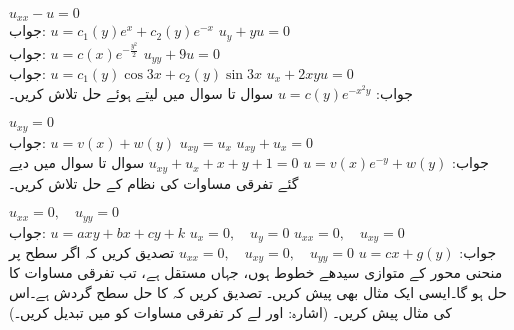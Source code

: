 \quad
$u_{xx}-u=0$\\
جواب:\quad
$u=c_1(y)e^x+c_2(y)e^{-x}$
\quad
$u_{y}+yu=0$\\
جواب:\quad
$u=c(x)e^{-\tfrac{y^2}{2}}$
\quad
$u_{yy}+9u=0$\\
جواب:\quad
$u=c_1(y)\cos 3x+c_2(y)\sin 3x$
\quad
$u_x+2xyu=0$\\
جواب:\quad
$u=c(y)e^{-x^2y}$
سوال  تا سوال  میں  لیتے ہوئے حل تلاش کریں۔

\quad
$u_{xy}=0$\\
جواب:\quad
$u=v(x)+w(y)$
\quad
$u_{xy}=u_x$
\quad
$u_{xy}+u_x=0$\\
جواب:\quad
$u=v(x)e^{-y}+w(y)$
\quad
$u_{xy}+u_x+x+y+1=0$
سوال  تا سوال  میں دیے گئے تفرقی مساوات کی نظام کے حل تلاش کریں۔ 

\quad
$u_{xx}=0,\quad u_{yy}=0$\\
جواب:\quad
$u=axy+bx+cy+k$
\quad
$u_{x}=0,\quad u_{y}=0$
\quad
$u_{xx}=0,\quad u_{xy}=0$\\
جواب:\quad
$u=cx+g(y)$
\quad
$u_{xx}=0,\quad u_{xy}=0,\quad u_{yy}=0$
\quad
تصدیق کریں کہ اگر سطح  پر منحنی  محور  کے متوازی سیدھے خطوط ہوں، جہاں  مستقل ہے، تب  تفرقی مساوات  کا حل ہو گا۔ایسی ایک مثال بھی پیش کریں۔  
\quad
تصدیق کریں کہ  کا حل  سطح گردش ہے۔اس کی مثال پیش کریں۔ (اشارہ:  اور  لے کر تفرقی مساوات کو  میں تبدیل کریں۔)

